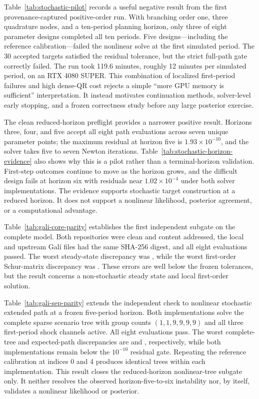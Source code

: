 \documentclass[11pt]{article}
\begin{document}
Table~\ref{tab:stochastic-pilot} records a useful negative result from the first
provenance-captured positive-order run.
With branching order one, three quadrature nodes, and a ten-period planning
horizon, only three of eight parameter designs completed all ten periods. Five
designs---including the reference calibration---failed the nonlinear solve at
the first simulated period. The 30 accepted targets satisfied the residual
tolerance, but the strict full-path gate correctly failed. The run took 119.6
minutes, roughly 12 minutes per simulated period, on an RTX 4080 SUPER. This
combination of localized first-period failures and high dense-QR cost rejects a
simple ``more GPU memory is sufficient'' interpretation. It instead motivates
continuation methods, solver-level early stopping, and a frozen correctness
study before any large posterior exercise.

The clean reduced-horizon preflight provides a narrower positive result.
Horizons three, four, and five accept all eight path evaluations across seven
unique parameter points; the maximum residual at horizon five is
$1.93\times10^{-10}$, and the solver takes five to seven Newton iterations.
Table~\ref{tab:stochastic-horizon-evidence} also shows
why this is a pilot rather than a terminal-horizon validation. First-step
outcomes continue to move as the horizon grows, and the difficult design fails
at horizon six with residuals near $1.02\times10^{-4}$ under both solver
implementations. The evidence supports stochastic target construction at a
reduced horizon. It does not support a nonlinear likelihood, posterior
agreement, or a computational advantage.

Table~\ref{tab:gali-core-parity} establishes the first independent subgate on
the complete model. Both repositories were clean and content addressed, the
local and upstream Gal\'i files had the same SHA-256 digest, and all eight
evaluations passed. The worst steady-state discrepancy was
\GaliCoreSSMax, while the worst first-order Schur-matrix discrepancy was
\GaliCoreFirstOrderMax. These errors are well below the frozen tolerances, but
the result concerns a non-stochastic steady state and local first-order
solution.

Table~\ref{tab:gali-sep-parity} extends the independent check to nonlinear
stochastic extended path at a frozen five-period horizon. Both implementations
solve the complete sparse scenario tree with group counts $(1,1,9,9,9,9)$ and all
three first-period shock channels active. All eight evaluations pass. The worst
complete-tree and expected-path discrepancies are \GaliSEPTreeMax{} and
\GaliSEPMeanMax{}, respectively, while both implementations remain below the
$10^{-10}$ residual gate. Repeating the reference calibration at indices 0 and 4
produces identical trees within each implementation. This result closes the
reduced-horizon nonlinear-tree subgate only. It neither resolves the observed
horizon-five-to-six instability nor, by itself, validates a nonlinear
likelihood or posterior.
\end{document}
